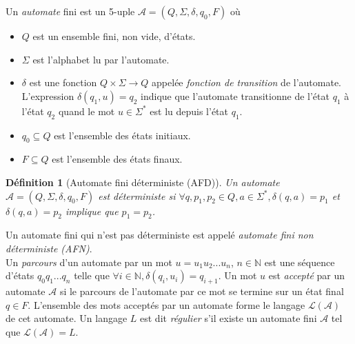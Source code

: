 \documentclass[12pt,a4paper,oneside,titlepage]{report}
\newtheorem{defi}{D\'efinition}[section]
\begin{document}
\noindent Un \emph{automate} fini est un 5-uple $\mathcal{A}=(Q,\Sigma,\delta,q_0,F)$ où 
\begin{itemize}
	\item $Q$ est un ensemble fini, non vide, d'états.
	\item $\Sigma$ est l'alphabet lu par l'automate.
	\item $\delta$ est une fonction $Q\times\Sigma\to Q$ appelée \emph{fonction de transition} de l'automate. L'expression $\delta(q_1,u)=q_2$ indique que l'automate transitionne de l'état $q_1$ à l'état $q_2$ quand le mot $u\in\Sigma^*$ est lu depuis l'état $q_1$.
	\item $q_0\subseteq Q$ est l'ensemble des états initiaux.
	\item $F\subseteq Q$ est l'ensemble des états finaux.
\end{itemize}
\begin{defi}[Automate fini déterministe (AFD)]
\label{deter}
Un automate $\mathcal{A}=(Q,\Sigma,\delta,q_0,F)$ est \emph{déterministe} si $\forall q,p_1,p_2\in Q, a\in\Sigma^*, \delta(q,a)=p_1$ et $\delta(q,a)=p_2$ implique que $p_1=p_2$.
\end{defi}
Un automate fini qui n'est pas déterministe est appelé \emph{automate fini non déterministe (AFN)}.\\

\noindent Un \emph{parcours} d'un automate par un mot $u=u_1u_2...u_n$, $n\in\mathbb{N}$ est une séquence d'états $q_0q_1...q_n$ telle que $\forall i\in\mathbb{N}, \delta(q_i,u_i)=q_{i+1}$. Un mot $u$ est \emph{accepté} par un automate $\mathcal{A}$ si le parcours de l'automate par ce mot se termine sur un état final $q\in F$. L'ensemble des mots acceptés par un automate forme le langage $\mathcal{L}(\mathcal{A})$ de cet automate. Un langage $L$ est dit \emph{régulier} s'il existe un automate fini $\mathcal{A}$ tel que $\mathcal{L}(\mathcal{A})=L$.\\
\end{document}
